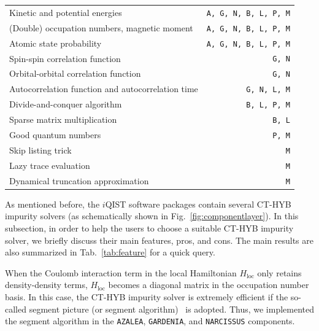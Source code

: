 \begin{longtable}{lr}
Kinetic and potential energies & \texttt{A, G, N, B, L, P, M} \\
(Double) occupation numbers, magnetic moment & \texttt{A, G, N, B, L, P, M} \\
Atomic state probability & \texttt{A, G, N, B, L, P, M} \\
Spin-spin correlation function & \texttt{G, N} \\
Orbital-orbital correlation function & \texttt{G, N} \\
Autocorrelation function and autocorrelation time & \texttt{G, N, L, M} \\
\hline
Divide-and-conquer algorithm & \texttt{B, L, P, M} \\
Sparse matrix multiplication & \texttt{B, L} \\
Good quantum numbers & \texttt{P, M} \\
Skip listing trick & \texttt{M} \\
Lazy trace evaluation & \texttt{M} \\
Dynamical truncation approximation & \texttt{M} \\
\hline\hline
\end{longtable}
As mentioned before, the $i$QIST software packages contain several CT-HYB impurity solvers (as schematically shown in Fig.~\ref{fig:componentlayer}). In this subsection, in order to help the users to choose a suitable CT-HYB impurity solver, we briefly discuss their main features, pros, and cons. The main results are also summarized in Tab.~\ref{tab:feature} for a quick query.

When the Coulomb interaction term in the local Hamiltonian $H_{\text{loc}}$ only retains density-density terms, $H_{\text{loc}}$ becomes a diagonal matrix in the occupation number basis. In this case, the CT-HYB impurity solver is extremely efficient if the so-called segment picture (or segment algorithm)~\cite{PhysRevLett.97.076405,RevModPhys.83.349} is adopted. Thus, we implemented the segment algorithm in the \texttt{AZALEA}, \texttt{GARDENIA}, and \texttt{NARCISSUS} components.

